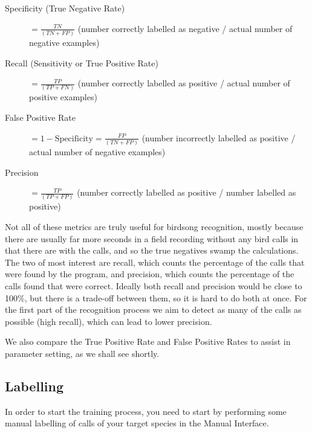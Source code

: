 \documentclass{article}
\begin{document}
\begin{description}
\item[Specificity (True Negative Rate)] $= \frac{TN}{(TN + FP)}$ (number correctly labelled as negative / actual number of negative examples)
\item[Recall (Sensitivity or True Positive Rate)] $= \frac{TP}{(TP + FN)}$ (number correctly labelled as positive / actual number of positive examples) 
\item[False Positive Rate] $= 1 - \mathrm{Specificity} = \frac{FP}{(TN + FP)}$ (number incorrectly labelled as positive / actual number of negative examples)
\item[Precision] $= \frac{TP}{(TP + FP)}$ (number correctly labelled as positive / number labelled as positive)
\end{description}

Not all of these metrics are truly useful for birdsong recognition, mostly because there are usually far more seconds in a field recording without any bird calls in that there are with the calls, and so the true negatives swamp the calculations. The two of most interest are recall, which counts the percentage of the calls that were found by the program, and precision, which counts the percentage of the calls found that were correct. Ideally both recall and precision would be close to 100\%, but there is a trade-off between them, so it is hard to do both at once. For the first part of the recognition process we aim to detect as many of the calls as possible (high recall), which can lead to lower precision. 

We also compare the True Positive Rate and False Positive Rates to assist in parameter setting, as we shall see shortly.

\subsection{Labelling}

In order to start the training process, you need to start by performing some manual labelling of calls of your target species in the Manual Interface.
\end{document}
